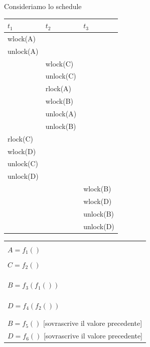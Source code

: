 Consideriamo lo schedule
\begin{multicols}{2}
\begin{flushright}
\begin{tabular}{|l|l|l|}
 \hline
 $t_1$ & $t_2$ & $t_3$\\
 \hline
 wlock(A)& &\\
 unlock(A)& &\\
 & wlock(C)& \\
 & unlock(C)& \\
 & rlock(A) & \\
 & wlock(B) &\\
  & unlock(A) &\\
  & unlock(B) &\\
 rlock(C) & &\\
 wlock(D) & &\\
 unlock(C)& & \\
 unlock(D)& & \\
 & & wlock(B)\\
 & & wlock(D)\\
 & & unlock(B)\\
 & & unlock(D)\\
\hline
 \end{tabular}
 \end{flushright}
 \begin{flushleft}
  \begin{tabular}{l}
   \\
   \\
   $A = f_1()$\\
   \\
   $C = f_2()$\\
   \\
   \\
   \\
   $B=f_3(f_1())$\\
   \\
   \\
   \\
   $D= f_4(f_2())$\\
   \\
   \\
   $B=f_5()$ [sovrascrive il valore precedente]\\
   $D=f_6()$ [sovrascrive il valore precedente]\\
  \end{tabular}

 \end{flushleft}

\end{multicols}


